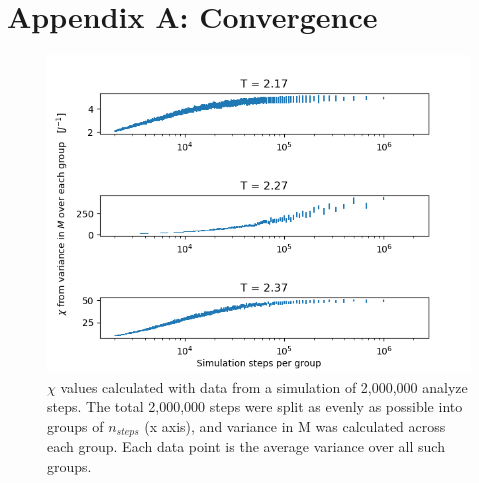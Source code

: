 \documentclass[letter,scriptaddress,twocolumn, prl]{revtex4}
\begin{document}
\appendix
\section{Appendix A: Convergence}

\begin{figure}[h]
	\begin{center}
		\includegraphics[width=.4\textwidth]{figs/figA1.png}
		\caption{$\chi$ values calculated with data from a simulation of 2,000,000 analyze steps. The total 2,000,000 steps were split as evenly as possible into groups of $n_{steps}$ (x axis), and variance in M was calculated across each group. Each data point is the average variance over all such groups.}
		\label{fig:figA1}
	\end{center}
\end{figure}
\end{document}
